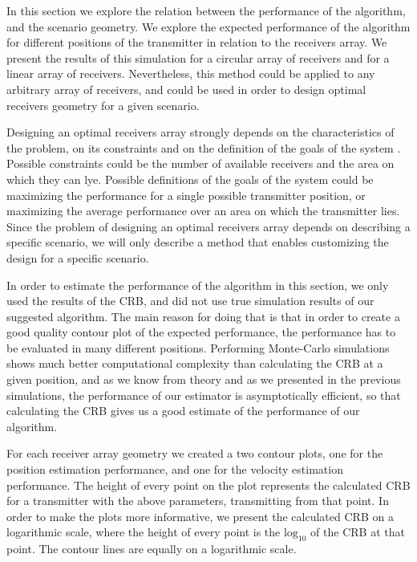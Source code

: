 In this section we explore the relation between the performance of the algorithm, and the scenario geometry. 
We explore the expected performance of the algorithm for different positions of the transmitter in relation to the receivers array. We present the results of this simulation for a circular array of receivers and for a linear array of receivers. Nevertheless, this method could be applied to any arbitrary array of receivers, and could be used in order to design optimal receivers geometry for a given scenario.

Designing an optimal receivers array strongly depends on the characteristics of the problem, on its constraints and on the definition of the goals of the system \cite{fowler_wu}. Possible constraints could be the number of available receivers and the area on which they can lye. Possible definitions of the goals of the system could be maximizing the performance for a single possible transmitter position, or maximizing the average performance over an area on which the transmitter lies. Since the problem of designing an optimal receivers array depends on describing a specific scenario, we will only describe a method that enables customizing the design for a specific scenario.

In order to estimate the performance of the algorithm in this section, we only used the results of the CRB, 
and did not use true simulation results of our suggested algorithm. The main reason for doing that is that in order to create a good quality contour plot of the expected performance, the performance has to be evaluated in many different positions. Performing Monte-Carlo simulations shows much better computational complexity than calculating the CRB at a given position, and as we know from theory and as we presented in the previous simulations, the performance of our estimator is asymptotically efficient, so that calculating the CRB gives us a good estimate of the performance of our algorithm.

For each receiver array geometry we created a two contour plots, one for the position estimation performance, and one for the velocity estimation performance. The height of every point on the plot represents the calculated CRB for a transmitter with the above parameters, transmitting from that point. In order to make the plots more informative, we present the calculated CRB on a logarithmic scale, where the height of every point is the $\text{log}_{10}$ of the CRB at that point. The contour lines are equally on a logarithmic scale.

